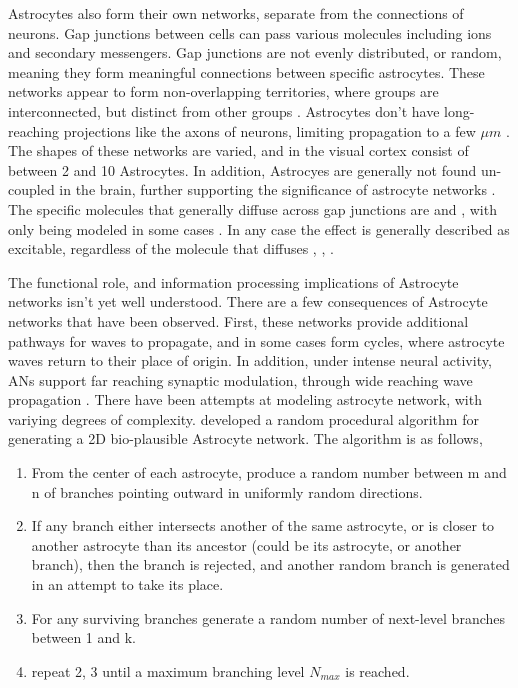     Astrocytes also form their own networks, separate from the connections of
    neurons. Gap junctions between cells can pass various molecules including
    ions and secondary messengers. Gap junctions are not evenly distributed, or
    random, meaning they form meaningful connections between specific
    astrocytes. These networks appear to form non-overlapping territories, where
    groups are interconnected, but distinct from other
    groups \parencite{mederos_2018}. Astrocytes don't have long-reaching
    projections like the axons of neurons, limiting \ca propagation to a few
    $\mu m$ \parencite{hofer_2002}. The shapes of these networks are varied,
    and in the visual cortex consist of between 2 and 10 Astrocytes. In
    addition, Astrocyes are generally not found un-coupled in the brain, further
    supporting the significance of astrocyte networks \parencite{postnov_2009}. The
    specific molecules that generally diffuse across gap junctions are \ipt and
    \ca, with only \ipt being modeled in some cases \parencite{pitta_2012}. In any
    case the effect is generally described as excitable, regardless of the
    molecule that diffuses \parencite{gordleeva_2021}, \parencite{pitta_2012},
    \parencite{postnov_2009}.

    The functional role, and information processing implications of Astrocyte
    networks isn't yet well understood. There are a few consequences of
    Astrocyte networks that have been observed. First, these networks provide
    additional pathways for \ca waves to propagate, and in some cases form
    cycles, where astrocyte waves return to their place of origin. In addition,
    under intense neural activity, ANs support far reaching synaptic modulation,
    through wide reaching \ca wave propagation \parencite{postnov_2009}. There
    have been attempts at modeling astrocyte network, with variying degrees of
    complexity. \parencite{postnov_2009} developed a random procedural algorithm
    for generating a 2D bio-plausible Astrocyte network. The algorithm is as
    follows,

    \begin{enumerate}
        \item From the center of each astrocyte, produce a random number between
          m and n of branches pointing outward in uniformly random directions.
        \item If any branch either intersects another of the same astrocyte, or
          is closer to another astrocyte than its ancestor (could be its
          astrocyte, or another branch), then the branch is rejected, and
          another random branch is generated in an attempt to take its place.
        \item For any surviving branches generate a random number of next-level
          branches between 1 and k.
        \item repeat 2, 3 until a maximum branching level $N_{max}$ is reached.
    \end{enumerate}

